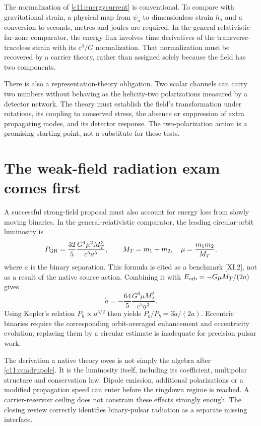 The normalization of \eqref{c11:energycurrent} is conventional. To compare with gravitational strain, a physical map from $\psi_a$ to dimensionless strain $h_a$ and a conversion to seconds, metres and joules are required. In the general-relativistic far-zone comparator, the energy flux involves time derivatives of the transverse-traceless strain with its $c^3/G$ normalization. That normalization must be recovered by a carrier theory, rather than assigned solely because the field has two components.

There is also a representation-theory obligation. Two scalar channels can carry two numbers without behaving as the helicity-two polarizations measured by a detector network. The theory must establish the field's transformation under rotations, its coupling to conserved stress, the absence or suppression of extra propagating modes, and its detector response. The two-polarization action is a promising starting point, not a substitute for these tests.

\section{The weak-field radiation exam comes first}
A successful strong-field proposal must also account for energy loss from slowly moving binaries. In the general-relativistic comparator, the leading circular-orbit luminosity is
\begin{equation}
 P_{\rm GR}=\frac{32}{5}\frac{G^4\mu^2 M_T^3}{c^5 a^5},
 \qquad M_T=m_1+m_2,\quad \mu=\frac{m_1m_2}{M_T},
 \label{c11:quadrupole}
\end{equation}
where $a$ is the binary separation. This formula is cited as a benchmark [XI.2], not as a result of the native source action. Combining it with $E_{\rm orb}=-G\mu M_T/(2a)$ gives
\begin{equation}
 \dot a=-\frac{64}{5}\frac{G^3\mu M_T^2}{c^5a^3}.
 \label{c11:adot}
\end{equation}
Using Kepler's relation $P_b\propto a^{3/2}$ then yields $\dot P_b/P_b=3\dot a/(2a)$. Eccentric binaries require the corresponding orbit-averaged enhancement and eccentricity evolution; replacing them by a circular estimate is inadequate for precision pulsar work.

The derivation a native theory owes is not simply the algebra after \eqref{c11:quadrupole}. It is the luminosity itself, including its coefficient, multipolar structure and conservation law. Dipole emission, additional polarizations or a modified propagation speed can enter before the ringdown regime is reached. A carrier-reservoir ceiling does not constrain these effects strongly enough. The closing review correctly identifies binary-pulsar radiation as a separate missing interface.

